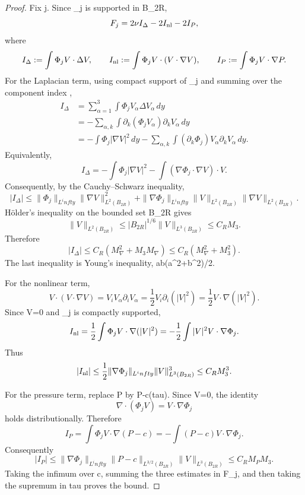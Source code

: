 \documentclass[11pt]{amsart}
\def\({}%
\def\){}%
\def\tau{tau}%
\def\infty{infty}%
\theoremstyle{plain}
\theoremstyle{definition}
\theoremstyle{remark}
\begin{document}
\begin{proof}
Fix \(j\).  Since \(\Phi_j\) is supported in \(B_{2R}\),
\[
  F_j=2\nu I_\Delta-2I_{\rm nl}-2I_P,
\]
where
\[
  I_\Delta:=\int \Phi_jV\cdot\Delta V,\qquad
  I_{\rm nl}:=\int \Phi_jV\cdot(V\cdot\nabla V),
  \qquad
  I_P:=\int \Phi_jV\cdot\nabla P.
\]
For the Laplacian term, using compact support of \(\Phi_j\) and summing over
the component index \(\alpha\),
\[
\begin{aligned}
  I_\Delta
  &=\sum_{\alpha=1}^3\int \Phi_j V_\alpha\Delta V_\alpha\,dy        \\
  &=-\sum_{\alpha,k}\int \partial_k(\Phi_jV_\alpha)\partial_kV_\alpha\,dy\\
  &=-\int \Phi_j|\nabla V|^2\,dy
    -\sum_{\alpha,k}\int(\partial_k\Phi_j)V_\alpha\partial_kV_\alpha\,dy .
\end{aligned}
\]
Equivalently,
\[
  I_\Delta
  =
  -\int \Phi_j|\nabla V|^2
  -\int(\nabla\Phi_j\cdot\nabla V)\cdot V .
\]
Consequently, by the Cauchy--Schwarz inequality,
\[
  |I_\Delta|
  \le
  \|\Phi_j\|_{L^\infty}\|\nabla V\|_{L^2(B_{2R})}^2
  +
  \|\nabla\Phi_j\|_{L^\infty}
  \|V\|_{L^2(B_{2R})}\|\nabla V\|_{L^2(B_{2R})}.
\]
H\"older's inequality on the bounded set \(B_{2R}\) gives
\[
  \|V\|_{L^2(B_{2R})}
  \le |B_{2R}|^{1/6}\|V\|_{L^3(B_{2R})}
  \le C_RM_3.
\]
Therefore
\[
  |I_\Delta|
  \le C_R(M_\nabla^2+M_3M_\nabla)
  \le C_R(M_\nabla^2+M_3^2).
\]
The last inequality is Young's inequality, \(ab\le(a^2+b^2)/2\).

For the nonlinear term,
\[
  V\cdot(V\cdot\nabla V)
  =
  V_iV_\alpha\partial_iV_\alpha
  =
  \frac12V_i\partial_i(|V|^2)
  =
  \frac12V\cdot\nabla(|V|^2).
\]
Since \(\nabla\cdot V=0\) and \(\Phi_j\) is compactly supported,
\[
  I_{\rm nl}
  =
  \frac12\int \Phi_jV\cdot\nabla(|V|^2)
  =
  -\frac12\int |V|^2V\cdot\nabla\Phi_j.
\]
Thus
\[
  |I_{\rm nl}|
  \le
  \frac12\|\nabla\Phi_j\|_{L^\infty}
  \|V\|_{L^3(B_{2R})}^3
  \le C_RM_3^3.
\]

For the pressure term, replace \(P\) by \(P-c(\tau)\).  Since
\(\nabla\cdot V=0\), the identity
\[
  \nabla\cdot(\Phi_j V)=V\cdot\nabla\Phi_j
\]
holds distributionally.  Therefore
\[
  I_P
  =
  \int \Phi_jV\cdot\nabla(P-c)
  =
  -\int(P-c)V\cdot\nabla\Phi_j.
\]
Consequently
\[
  |I_P|
  \le
  \|\nabla\Phi_j\|_{L^\infty}
  \|P-c\|_{L^{3/2}(B_{2R})}
  \|V\|_{L^3(B_{2R})}
  \le C_RM_PM_3.
\]
Taking the infimum over \(c\), summing the three estimates in \(F_j\), and
then taking the supremum in \(\tau\) proves the bound.
\end{proof}
\end{document}
